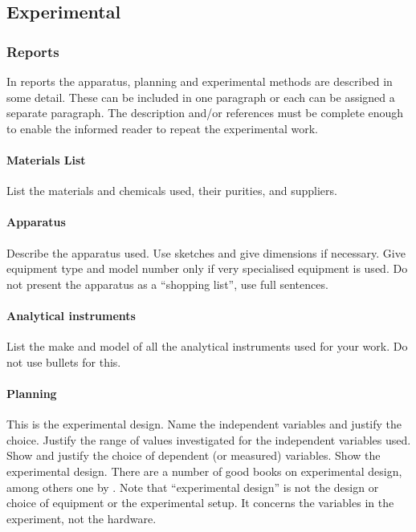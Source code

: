 \documentclass[a5paper, 10pt]{article}
\begin{document}
\subsection{Experimental}
\label{sec:experimental}
\subsubsection{Reports}

In reports the apparatus, planning and experimental methods are
described in some detail.  These can be included in one paragraph or
each can be assigned a separate paragraph.  The description and/or
references must be complete enough to enable the informed reader to
repeat the experimental work.

\paragraph{Materials List}
List the materials and chemicals used, their purities, and suppliers.

\paragraph{Apparatus} 
Describe the apparatus used.  Use sketches and give dimensions if
necessary.  Give equipment type and model number only if very specialised
equipment is used.  Do not present the apparatus as a ``shopping
list'', use full sentences. 

\paragraph{Analytical instruments}
List the make and model of all the analytical instruments used for your work. Do not use bullets for this.

\paragraph{Planning}
This is the experimental design.
Name the independent variables and justify the choice.  Justify the
range of values investigated for the independent variables used.  Show
and justify the choice of dependent (or measured) variables.  Show the
experimental design.  There are a number of good books on experimental
design, among others one by \citet{hicks}.  Note that
``experimental design'' is not the design or choice of equipment or
the experimental setup.  It concerns the variables in the experiment,
not the hardware.
\end{document}
